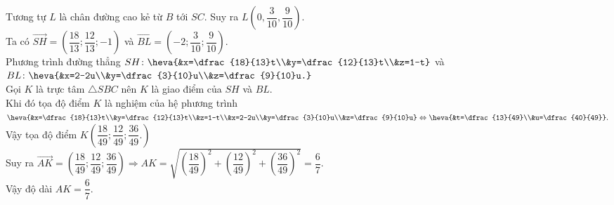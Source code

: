 \begin{ex}
{		Tương tự $L$ là chân đường cao kẻ từ $B$ tới $SC$. Suy ra $L\left(0, \dfrac{3}{10}, \dfrac{9}{10}\right)$.\\
		Ta có $\vec{SH}=\left(\dfrac{18}{13};\dfrac{12}{13}; -1\right)$ và $\vec{BL}=\left(-2;\dfrac{3}{10};\dfrac{9}{10}\right) $.\\
		Phương trình đường thẳng $SH\colon\heva{&x=\dfrac{18}{13}t\\&y=\dfrac{12}{13}t\\&z=1-t}$ và $BL\colon \heva{&x=2-2u\\&y=\dfrac{3}{10}u\\&z=\dfrac{9}{10}u.}$\\
		Gọi $K$ là trực tâm $\triangle SBC$ nên $K$ là giao điểm của $SH$ và $BL$.\\
		Khi đó tọa độ điểm $K$ là nghiệm của hệ phương trình $\heva{&x=\dfrac{18}{13}t\\&y=\dfrac{12}{13}t\\&z=1-t\\&x=2-2u\\&y=\dfrac{3}{10}u\\&z=\dfrac{9}{10}u}\Leftrightarrow \heva{&t=\dfrac{13}{49}\\&u=\dfrac{40}{49}}.$\\
		Vậy tọa độ điểm $K\left(\dfrac{18}{49};\dfrac{12}{49};\dfrac{36}{49}.\right)$\\
		Suy ra $\vec{AK}=\left(\dfrac{18}{49};\dfrac{12}{49};\dfrac{36}{49}\right)\Rightarrow AK=\sqrt{\left(\dfrac{18}{49}\right)^2 + \left(\dfrac{12}{49}\right)^2 + \left(\dfrac{36}{49}\right)^2}=\dfrac{6}{7}$.\\
		Vậy độ dài $AK = \dfrac{6}{7}$.
	}
	
\end{ex}

